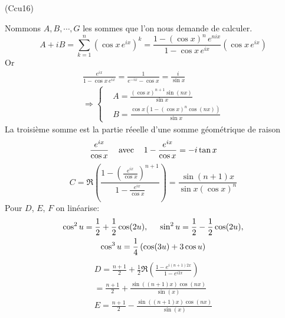 \begin{tiny}(Ccu16)\end{tiny} Nommons $A, B, \cdots, G$ les sommes que l'on nous demande de calculer.
\begin{displaymath}
  A + iB = \sum_{k=1}^{n}(\cos x\, e^{ix})^k = \frac{1-(\cos x)^{n}\,e^{nix}}{1-\cos x\,e^{ix}} (\cos x\, e^{ix})
\end{displaymath}
Or
\begin{multline*}
\frac{e^{ix}}{1-\cos x\,e^{ix}} = \frac{1}{e^{-ix}-\cos x} = \frac{i}{\sin x}\\
\Rightarrow
\left\lbrace 
\begin{aligned}
 &A = \frac{(\cos x)^{n+1}\sin(nx)}{\sin x}\\
 &B = \frac{\cos x(1 - (\cos x)^n \cos(nx))}{\sin x}
\end{aligned}
\right. 
\end{multline*}
La troisième somme est la partie réeelle d'une somme géométrique de raison 
\begin{displaymath}
\frac{e^{ix}}{\cos x} \hspace{0.3cm}\text{ avec } \hspace{0.3cm} 1- \frac{e^{ix}}{\cos x} = -i\tan x  
\end{displaymath}
\begin{displaymath}
  C = \Re\left( \frac{1-\left( \frac{e^{ix}}{\cos x}\right)^{n+1} }{1-\frac{e^{ix}}{\cos x}}\right) 
  = \frac{\sin(n+1)x}{\sin x (\cos x)^n}
\end{displaymath}
Pour $D$, $E$, $F$ on linéarise:
\begin{multline*}
  \cos^2 u = \frac{1}{2} + \frac{1}{2}\cos(2u), \hspace{0.5cm}
  \sin^2 u = \frac{1}{2} - \frac{1}{2}\cos(2u),\\
  \cos^3 u = \frac{1}{4}\left( \cos(3u) + 3\cos u\right) 
\end{multline*}
\begin{multline*}
  D = \frac{n+1}{2} +\frac{1}{2}\Re\left(\frac{1-e^{i(n+1)2x}}{1-e^{i2x}} \right) \\
  = \frac{n+1}{2} +\frac{\sin((n+1)x)\cos(nx)}{\sin(x)}\\
  E = \frac{n+1}{2} -\frac{\sin((n+1)x)\cos(nx)}{\sin(x)}
\end{multline*}
